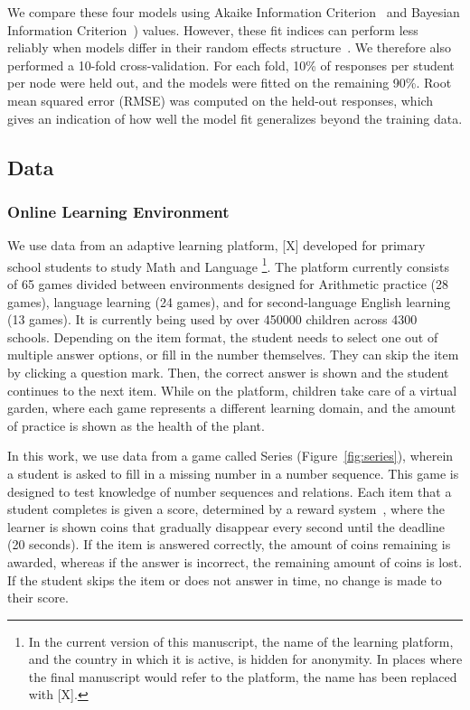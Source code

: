 \documentclass[11pt]{article}
\begin{document}
We compare these four models using Akaike Information Criterion~\parencite[AIC;][]{akaike2003new} and Bayesian Information Criterion~\parencite[BIC;][]{schwarz1978estimating}) values. However, these fit indices can perform less reliably when models differ in their random effects structure~\parencite{vaida2005conditional, greven2010behaviour}. We therefore also performed a 10-fold cross-validation. For each fold, 10\% of responses per student per node were held out, and the models were fitted on the remaining 90\%. Root mean squared error (RMSE) was computed on the held-out responses, which gives an indication of how well the model fit generalizes beyond the training data. 

\subsection{Data}
\subsubsection{Online Learning Environment}
We use data from an adaptive learning platform, [X] developed for primary school students to study Math and Language \footnote{In the current version of this manuscript, the name of the learning platform, and the country in which it is active, is hidden for anonymity. In places where the final manuscript would refer to the platform, the name has been replaced with [X].}. The platform currently consists of 65 games divided between environments designed for Arithmetic practice (28 games), language learning (24 games), and for second-language English learning (13 games). It is currently being used by over \num{450000} children across \num{4300} schools. Depending on the item format, the student needs to select one out of multiple answer options, or fill in the number themselves. They can skip the item by clicking a question mark. Then, the correct answer is shown and the student continues to the next item. While on the platform, children take care of a virtual garden, where each game represents a different learning domain, and the amount of practice is shown as the health of the plant. 

In this work, we use data from a game called Series (Figure~\ref{fig:series}), wherein a student is asked to fill in a missing number in a number sequence. This game is designed to test knowledge of number sequences and relations. Each item that a student completes is given a score, determined by a reward system~\parencite[for an overview, see][]{maris2012speed}, where the learner is shown coins that gradually disappear every second until the deadline (20 seconds). If the item is answered correctly, the amount of coins remaining is awarded, whereas if the answer is incorrect, the remaining amount of coins is lost. If the student skips the item or does not answer in time, no change is made to their score. 
\end{document}
